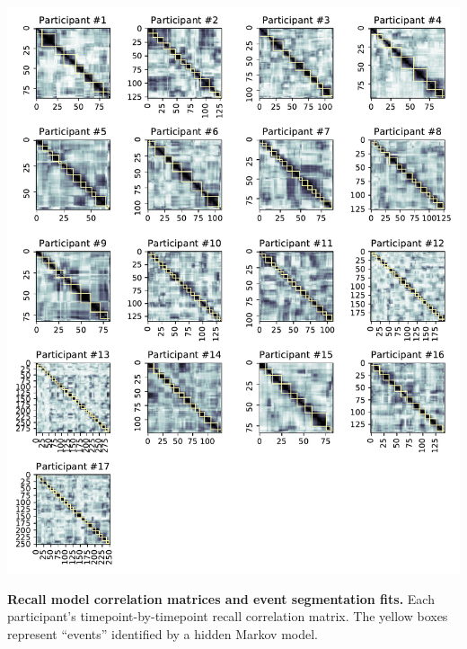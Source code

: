 \documentclass{article}
\begin{document}
\begin{suppfigure}[t!]
\centering
\includegraphics[width=1\textwidth]{figs/supp1_corrmats.pdf}
\caption{\small \textbf{Recall model correlation matrices and event segmentation fits.} Each participant's timepoint-by-timepoint recall correlation matrix.  The yellow boxes represent ``events'' identified by a hidden Markov model.}
\label{fig:corrmats}
\end{suppfigure}
\end{document}
